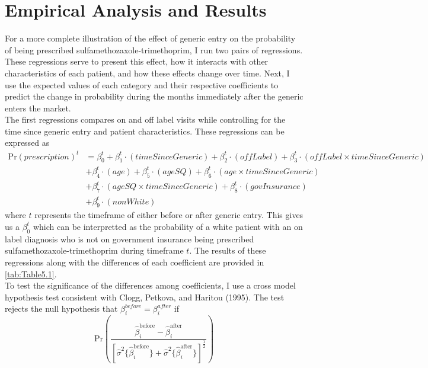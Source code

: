 \chapter{Empirical Analysis and Results}
For a more complete illustration of the effect of generic entry on the probability of being prescribed sulfamethozaxole-trimethoprim, I run two pairs of regressions. These regressions serve to present this effect, how it interacts with other characteristics of each patient, and how these effects change over time. Next, I use the expected values of each category and their respective coefficients to predict the change in probability during the months immediately after the generic enters the market. \\
\indent The first regressions compares on and off label visits while controlling for the time since generic entry and patient characteristics. These regressions can be expressed as
\begin{equation}
\begin{split}
    \text{Pr}(prescription)^t & = \beta^t_0 + \beta^t_1\cdot(timeSinceGeneric) + \beta_2^t\cdot(offLabel) + \beta_3^t\cdot(offLabel\times timeSinceGeneric)\\
    & + \beta_4^t\cdot(age) + \beta_5^t\cdot(ageSQ)  + \beta_6^t\cdot(age\times timeSinceGeneric)\\
    & + \beta_7^t\cdot(ageSQ\times timeSinceGeneric)  + \beta_8^t\cdot(govInsurance)\\
    & + \beta_9^t\cdot(nonWhite)
\end{split}
\end{equation}
where $t$ represents the timeframe of either before or after generic entry. This gives us a $\beta_0^t$ which can be interpretted as the probability of a white patient with an on label diagnosis who is not on government insurance being prescribed sulfamethozaxole-trimethoprim during timeframe $t$. The results of these regressions along with the differences of each coefficient are provided in \autoref{tab:Table5.1}.\\
\indent To test the significance of the differences among coefficients, I use a cross model hypothesis test consistent with Clogg, Petkova, and Haritou (1995)\cite{clogg_statistical_1995}. The test rejects the null hypothesis that $\beta_i^{before} = \beta_i^{after}$ if 
\begin{equation}
\text{Pr}(\frac{\hat{\beta}^\text{before}_i - \hat{\beta}^\text{after}_i}{[\hat{\sigma}^2\{\hat{\beta}^\text{before}_i\} + \hat{\sigma}^2\{\hat{\beta}^\text{after}_i\}]^\frac{1}{2}})
\end{equation}
